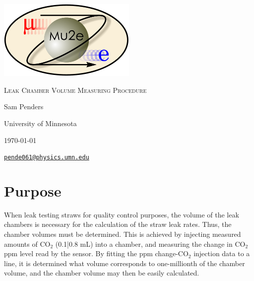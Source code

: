 \documentclass[letterpaper,12pt]{article}
\begin{document}
\begin{titlepage}
	\centering
	\includegraphics[width=0.5\textwidth]{mu2e_logo_oval.png}\par\vspace{2cm}
	{\scshape\LARGE Leak Chamber Volume Measuring Procedure\par}
	\vspace{3cm}
	{\Large Sam Penders\par}
	\vspace{3cm}
	{\large University of Minnesota\par}
 	\vspace{.5cm}
	{\large \today \par}
	\vfill
	{\par}
	\href{mailto:pende061@physics.umn.edu}{\tt{pende061@physics.umn.edu}}
\end{titlepage}

\clearpage
\setcounter{page}{2}

\section{Purpose}
When leak testing straws for quality control purposes, the volume of the leak chambers is necessary for the calculation of the straw leak rates. Thus, the chamber volumes must be determined. This is achieved by injecting measured amounts of CO$_2$ (0.1|0.8 mL) into a chamber, and measuring the change in CO$_2$ ppm level read by the sensor. By fitting the ppm change-CO$_2$ injection data to a line, it is determined what volume corresponds to one-millionth of the chamber volume, and the chamber volume may then be easily calculated.
\end{document}
